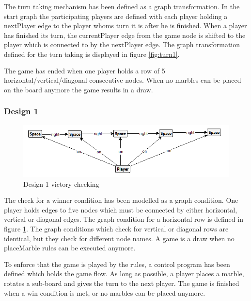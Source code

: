 The turn taking mechanism has been defined as a graph transformation.
In the start graph the participating players are defined with each player holding a nextPlayer edge to the player whoms turn it is after he is finished.
When a player has finished its turn, the currentPlayer edge from the game node is shifted to the player which is connected to by the nextPlayer edge.
The graph transformation defined for the turn taking is displayed in figure \ref{fig:turn1}.

The game has ended when one player holds a row of 5 horizontal/vertical/diagonal consecutive nodes.
When no marbles can be placed on the board anymore the game results in a draw.

\subsubsection{Design 1}
\begin{figure}[!h]
    \centering
    \includegraphics[scale=0.5,clip]{Images/endgame1.png}
    \caption{Design 1 victory checking}
    \label{fig:endgame1}
\end{figure}

The check for a winner condition has been modelled as a graph condition.
One player holds edges to five nodes which must be connected by either horizontal, vertical or diagonal edges.
The graph condition for a horizontal row is defined in figure \ref{fig:endgame1}.
The graph conditions which check for vertical or diagonal rows are identical, but they check for different node names.
A game is a draw when no placeMarble rules can be executed anymore.

To enforce that the game is played by the rules, a control program has been defined which holds the game flow.
As long as possible, a player places a marble, rotates a sub-board and gives the turn to the next player.
The game is finished when a win condition is met, or no marbles can be placed anymore.